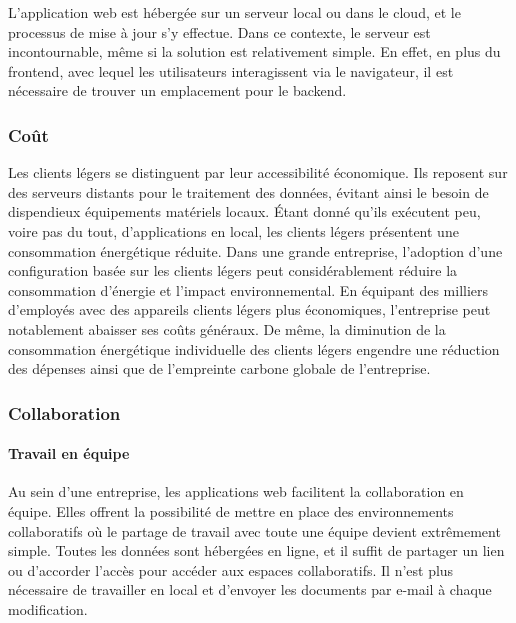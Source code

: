 \documentclass[a4paper, 12pt, french]{article}
\begin{document}
				L'application web est hébergée sur un serveur local ou dans le cloud, et le processus de mise à jour s'y effectue. Dans ce contexte, le serveur est incontournable, même si la solution est relativement simple. En effet, en plus du frontend, avec lequel les utilisateurs interagissent via le navigateur, il est nécessaire de trouver un emplacement pour le backend.
			
			\subsubsection{Coût}
				Les clients légers se distinguent par leur accessibilité économique. Ils reposent sur des serveurs distants pour le traitement des données, évitant ainsi le besoin de dispendieux équipements matériels locaux. Étant donné qu'ils exécutent peu, voire pas du tout, d'applications en local, les clients légers présentent une consommation énergétique réduite. Dans une grande entreprise, l'adoption d'une configuration basée sur les clients légers peut considérablement réduire la consommation d'énergie et l'impact environnemental. En équipant des milliers d'employés avec des appareils clients légers plus économiques, l'entreprise peut notablement abaisser ses coûts généraux. De même, la diminution de la consommation énergétique individuelle des clients légers engendre une réduction des dépenses ainsi que de l'empreinte carbone globale de l'entreprise.
			
			\subsubsection{Collaboration}
				\paragraph{Travail en équipe\\}
					Au sein d'une entreprise, les applications web facilitent la collaboration en équipe. Elles offrent la possibilité de mettre en place des environnements collaboratifs où le partage de travail avec toute une équipe devient extrêmement simple. Toutes les données sont hébergées en ligne, et il suffit de partager un lien ou d'accorder l'accès pour accéder aux espaces collaboratifs. Il n'est plus nécessaire de travailler en local et d'envoyer les documents par e-mail à chaque modification.			
			
\end{document}
